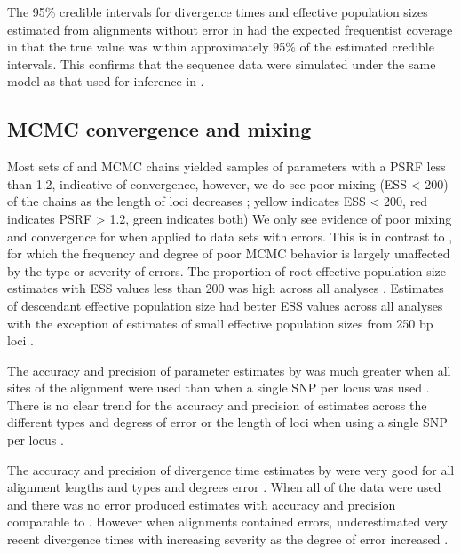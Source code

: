 The 95\% credible intervals for divergence times and effective population 
sizes estimated from alignments without error in \beast had the expected 
frequentist coverage in that the true value was within approximately 95\% of the 
estimated credible intervals. 
This confirms that the sequence data were simulated under the same model as 
that used for inference in \beast. 


\subsection{MCMC convergence and mixing}
Most sets of \beast and \ecoevolity MCMC chains yielded samples of parameters with
a PSRF less than 1.2, indicative of convergence,
however, we do see poor mixing (ESS < 200) of the \beast chains as the length
of loci decreases \mainfigsp;
yellow indicates ESS < 200, red indicates PSRF > 1.2, green indicates both)
We only see evidence of poor mixing and convergence for \ecoevolity when
applied to data sets with errors.
This is in contrast to \beast, for which the frequency and degree of poor MCMC
behavior is largely unaffected by the type or severity of errors.
The proportion of \beast root effective population size estimates with ESS 
values less than 200 was high across all analyses \rootfigsp. 
Estimates of descendant effective population size had better ESS values across all 
analyses with the exception of estimates of small effective population sizes from 
250 bp loci \thetafigsp.

The accuracy and precision of parameter estimates by \ecoevolity was much greater
when all sites of the alignment were used than when a single SNP per locus was used \mainfigsp.  
There is no clear trend for the accuracy and precision of \ecoevolity estimates across the
different types and degress of error or the length of loci when using a single SNP per locus \mainfigsp. 

The accuracy and precision of divergence time estimates by \beast were very good for all 
alignment lengths and types and degrees error \timefigsp. 
When all of the data were used and there was no error \ecoevolity produced 
estimates with accuracy and precision comparable to \beast \timefigsp. 
However when alignments contained errors, \ecoevolity underestimated very recent 
divergence times with increasing severity as the degree of error increased \timefigsp. 

